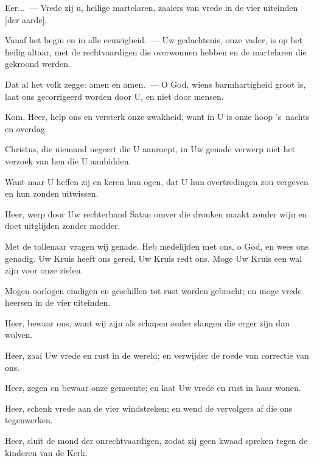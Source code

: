 \documentclass[12pt,twoside,a5paper]{article}
\begin{document}
\begin{halfparskip}
  Eer...~--- Vrede zij u, heilige martelaren, zaaiers van vrede in de vier uiteinden [der aarde].

  Vanaf het begin en in alle eeuwigheid.~--- Uw gedachtenis, onze vader, is op het heilig altaar, met de rechtvaardigen die overwonnen hebben en de martelaren die gekroond werden.

  Dat al het volk zegge: amen en amen.~--- O God, wiens barmhartigheid groot is, laat ons gecorrigeerd worden door U, en niet door mensen.

  Kom, Heer, help ons en versterk onze zwakheid, want in U is onze hoop 's~nachts en overdag.

  Christus, die niemand negeert die U aanroept, in Uw genade verwerp niet het verzoek van hen die U aanbidden.

  Want naar U heffen zij en keren hun ogen, dat U hun overtredingen zou vergeven en hun zonden uitwissen.

  Heer, werp door Uw rechterhand Satan omver die dronken maakt zonder wijn en doet uitglijden zonder modder.

  Met de tollenaar vragen wij genade. Heb medelijden met ons, o God, en wees ons genadig. Uw Kruis heeft ons gered, Uw Kruis redt ons. Moge Uw Kruis een wal zijn voor onze zielen.

  Mogen oorlogen eindigen en geschillen tot rust worden gebracht; en moge vrede heersen in de vier uiteinden.

  Heer, bewaar ons, want wij zijn als schapen onder slangen die erger zijn dan wolven.

  Heer, zaai Uw vrede en rust in de wereld; en verwijder de roede van correctie van ons.

  Heer, zegen en bewaar onze gemeente; en laat Uw vrede en rust in haar wonen.

  Heer, schenk vrede aan de vier windstreken; en wend de vervolgers af die ons tegenwerken.

  Heer, sluit de mond der onrechtvaardigen, zodat zij geen kwaad spreken tegen de kinderen van de Kerk.
\end{halfparskip}

\end{document}
